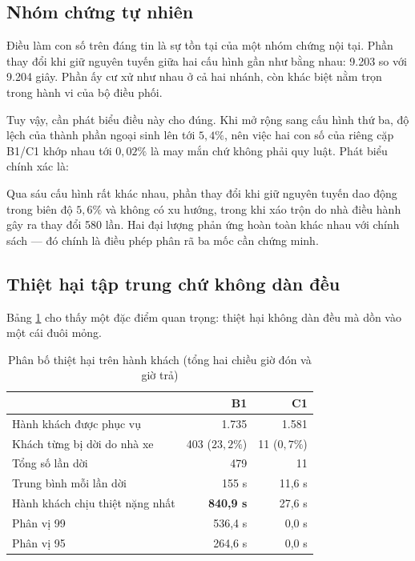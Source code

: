 \subsection{Nhóm chứng tự nhiên}

Điều làm con số trên đáng tin là sự tồn tại của một nhóm chứng nội tại. Phần thay đổi khi giữ
nguyên tuyến giữa hai cấu hình gần như bằng nhau: 9.203 so với 9.204 giây. Phần ấy cư xử như nhau
ở cả hai nhánh, còn khác biệt nằm trọn trong hành vi của bộ điều phối.

Tuy vậy, cần phát biểu điều này cho đúng. Khi mở rộng sang cấu hình thứ ba, độ lệch của thành
phần ngoại sinh lên tới $5{,}4\%$, nên việc hai con số của riêng cặp B1/C1 khớp nhau tới
$0{,}02\%$ là may mắn chứ không phải quy luật. Phát biểu chính xác là:

\begin{khungy}
Qua sáu cấu hình rất khác nhau, phần thay đổi khi giữ nguyên tuyến dao động trong biên độ
$5{,}6\%$ và không có xu
hướng, trong khi xáo trộn do nhà điều hành gây ra thay đổi 580 lần. Hai đại lượng phản ứng hoàn
toàn khác nhau với chính sách --- đó chính là điều phép phân rã ba mốc cần chứng minh.
\end{khungy}

\subsection{Thiệt hại tập trung chứ không dàn đều}

Bảng \ref{bang:taptrung} cho thấy một đặc điểm quan trọng: thiệt hại không dàn đều mà dồn vào
một cái đuôi mỏng.

\begin{table}[htbp]
\centering
\caption{Phân bố thiệt hại trên hành khách (tổng hai chiều giờ đón và giờ trả)}
\label{bang:taptrung}
\small
\begin{tabular}{@{}lrr@{}}
\toprule
& \textbf{B1} & \textbf{C1}\\
\midrule
Hành khách được phục vụ & 1.735 & 1.581\\
Khách từng bị dời do nhà xe & 403 ($23{,}2\%$) & 11 ($0{,}7\%$)\\
Tổng số lần dời & 479 & 11\\
Trung bình mỗi lần dời & 155 s & 11{,}6 s\\
Hành khách chịu thiệt nặng nhất & \textbf{840{,}9 s} & 27{,}6 s\\
Phân vị 99 & 536{,}4 s & 0{,}0 s\\
Phân vị 95 & 264{,}6 s & 0{,}0 s\\
\bottomrule
\end{tabular}
\end{table}

